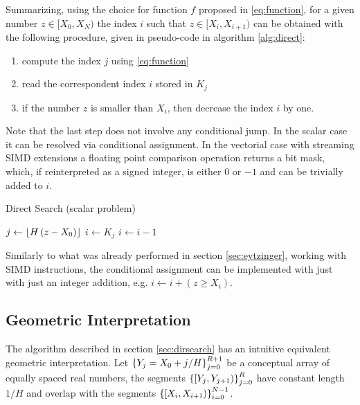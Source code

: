 \documentclass[preprint,1p,times]{elsarticle}
\begin{document}
Summarizing, using the choice for function $f$ proposed in \eqref{eq:function}, for a given number $z\in [X_0,X_N)$ the index $i$ such that $z\in [X_i,X_{i+1})$ can be obtained with the following procedure, given in pseudo-code in algorithm \ref{alg:direct}:
\begin{enumerate}
	\item compute the index $j$ using \eqref{eq:function}
	\item read the correspondent index $i$ stored in $K_j$
	\item if the number $z$ is smaller than $X_i$, then decrease the index $i$ by one.
\end{enumerate}
Note that the last step does not involve any conditional jump. In the scalar case it can be resolved via conditional assignment. In the vectorial case with streaming SIMD extensions a floating point comparison operation returns a bit mask, which, if reinterpreted as a signed integer, is either $0$ or $-1$ and can be trivially added to $i$.

\begin{algorithm}
	\caption{Direct Search (scalar problem)}
	\label{alg:direct}
	\begin{algorithmic}
		\State $j \leftarrow \left \lfloor  H \, (z-X_0)  \right \rfloor$
		\State $i \leftarrow K_j$
			\State $i \leftarrow i-1$ 
		\EndIf
		\EndFunction
	\end{algorithmic}
\end{algorithm}

Similarly to what was already performed in section \ref{sec:eytzinger}, working with SIMD instructions, the conditional assignment can be implemented with just with just an integer addition, e.g. $i \leftarrow i + (z \geq X_i)$.

\subsection{Geometric Interpretation}
\label{sec:geometric}

The algorithm described in section \eqref{sec:dirsearch} has an intuitive equivalent geometric interpretation.
Let $\left \{ Y_j=X_0+j/H \right \}_{j=0}^{R+1}$ be a conceptual array of equally spaced real numbers, the segments $\left \{ [Y_{j},Y_{j+1}) \right \}_{j=0}^{R}$ have constant length $1/H$ and overlap with the segments $\left \{ [X_{i},X_{i+1}) \right \}_{i=0}^{N-1}$.
\end{document}
